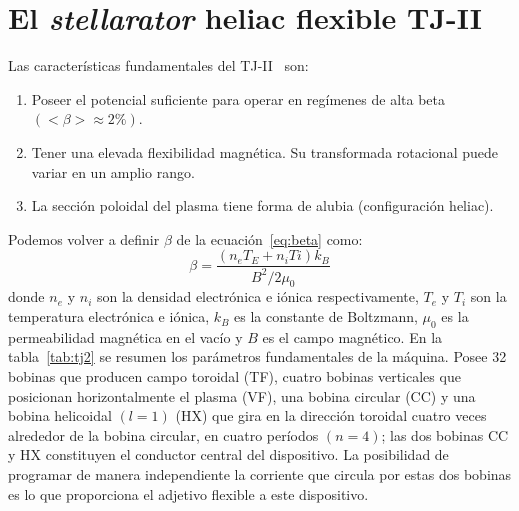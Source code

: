 \section{El \textit{stellarator} heliac flexible TJ-II}
Las características fundamentales del TJ-II~\cite{doi:10.13182/FST17-131-139} son:
\begin{enumerate}[(1)]
    \item Poseer el potencial suficiente para operar en regímenes de alta beta $(<\beta>\approx2\%)$.
    \item Tener una elevada flexibilidad magnética. Su transformada rotacional puede variar
    en un amplio rango.
    \item La sección poloidal del plasma tiene forma de alubia (configuración heliac).
\end{enumerate}
Podemos volver a definir $\beta$ de la ecuación~\eqref{eq:beta} como:
\begin{equation}\label{eq:beta2}
    \beta=\frac{(n_eT_E+n_iTi)k_B}{B^2/2\mu_0}
\end{equation}
donde $n_e$ y $n_i$ son la densidad electrónica e iónica respectivamente, $T_e$ y $T_i$ son la temperatura
electrónica e iónica, $k_B$ es la constante de Boltzmann, $\mu_0$ es la permeabilidad magnética en el
vacío y $B$ es el campo magnético.
En la tabla~\ref{tab:tj2} se resumen los parámetros fundamentales de la máquina. Posee 32 bobinas
que producen campo toroidal (TF), cuatro bobinas verticales que posicionan horizontalmente
el plasma (VF), una bobina circular (CC) y una bobina helicoidal $(l=1)$ (HX) que gira
en la dirección toroidal cuatro veces alrededor de la bobina circular, en cuatro períodos $(n=4)$; las dos bobinas CC y
HX constituyen el conductor central del dispositivo. La posibilidad de programar de manera
independiente la corriente que circula por estas dos bobinas es lo que proporciona el adjetivo
flexible a este dispositivo.
